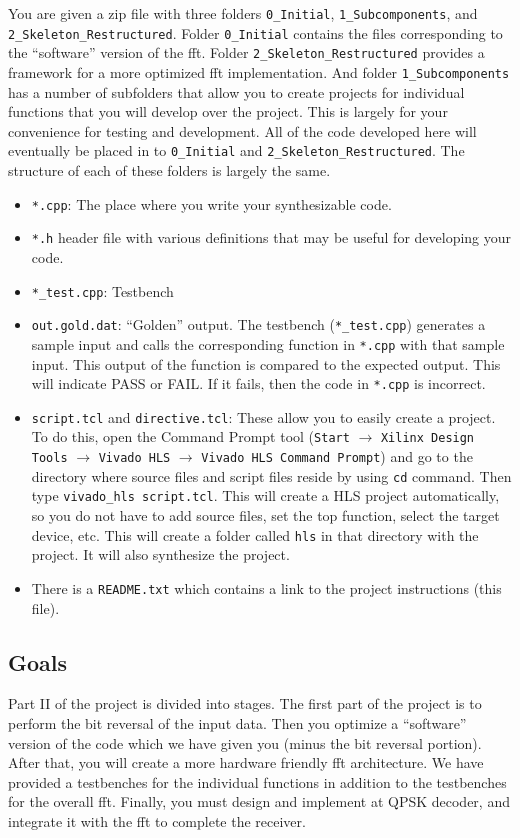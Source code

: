 You are given a zip file with three folders \texttt{0\_Initial}, \texttt{1\_Subcomponents}, and \texttt{2\_Skeleton\_Restructured}.  Folder \texttt{0\_Initial} contains the files corresponding to the ``software'' version of the \gls{fft}. Folder \texttt{2\_Skeleton\_Restructured} provides a framework for a more optimized \gls{fft} implementation. And folder \texttt{1\_Subcomponents} has a number of subfolders that allow you to create projects for individual functions that you will develop over the project. This is largely for your convenience for testing and development. All of the code developed here will eventually be placed in to \texttt{0\_Initial} and \texttt{2\_Skeleton\_Restructured}.
The structure of each of these folders is largely the same.
\begin{itemize}
\item \texttt{*.cpp}: The place where you write your synthesizable code.
\item \texttt{*.h} header file with various definitions that may be useful for developing your code.
\item \texttt{*\_test.cpp}: Testbench
\item \texttt{out.gold.dat}: ``Golden'' output. The testbench (\texttt{*\_test.cpp}) generates a sample input and calls the corresponding function in \texttt{*.cpp} with that sample input. This output of the function is compared to the expected output. This will indicate PASS or FAIL. If it fails, then the code in \texttt{*.cpp} is incorrect.
\item \texttt{script.tcl} and \texttt{directive.tcl}: These allow you to easily create a project. To do this, open the \VHLS Command Prompt tool (\texttt{Start} $\rightarrow$ \texttt{Xilinx Design Tools} $\rightarrow$ \texttt{Vivado HLS} $\rightarrow$ \texttt{Vivado HLS Command Prompt}) and go to the directory where source files and script files reside by using \texttt{cd} command. Then type \texttt{vivado\_hls script.tcl}. This will create a HLS project automatically, so you do not have to add source files, set the top function, select the target device, etc. This will create a folder called \texttt{hls} in that directory with the project. It will also synthesize the project.
\item There is a \texttt{README.txt} which contains a link to the project instructions (this file). 
\end{itemize}

\subsection{Goals}
Part II of the project is divided into stages. The first part of the project is to perform the bit reversal of the input data. Then you optimize a ``software'' version of the code which we have given you (minus the bit reversal portion). After that, you will create a more hardware friendly \gls{fft} architecture. We have provided a testbenches for the individual functions in addition to the testbenches for the overall \gls{fft}. Finally, you must design and implement at QPSK decoder, and integrate it with the \gls{fft} to complete the receiver.

